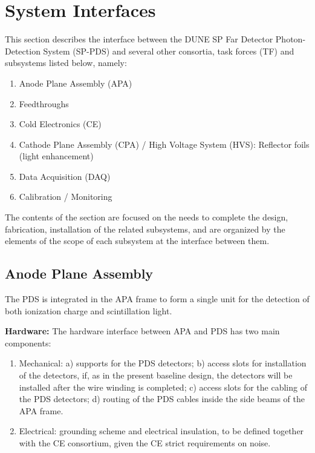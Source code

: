 \section{System Interfaces}
\label{sec:fdsp-pd-intfc}



This section describes the interface between the DUNE SP Far Detector Photon-Detection System (SP-PDS) and several other consortia, task forces (TF) and subsystems listed below, namely:

\begin{enumerate}
\item Anode Plane Assembly (APA)
\item{Feedthroughs}
\item Cold Electronics (CE)
\item{Cathode Plane Assembly (CPA) / High Voltage System (HVS): Reflector foils (light enhancement)}
\item Data Acquisition (DAQ)
\item Calibration / Monitoring
\end{enumerate}

The contents of the section are focused on the needs to complete the design, fabrication, installation of the related subsystems, and are organized by the elements of the scope of each subsystem at the interface between them.
\subsection{Anode Plane Assembly}
\label{sec:fdsp-pd-intfc-apa}
The PDS is integrated in the APA frame to form a single unit for the detection of both ionization charge and scintillation light.

\textbf{Hardware:}
The hardware interface between APA and PDS has two main components:
\begin{enumerate}
\item Mechanical: a) supports for the PDS detectors; b) access slots for installation of the detectors, if, as in the present baseline design, the detectors will be installed after the wire winding is completed; c) access slots for the cabling of the PDS detectors; d) routing of the PDS cables inside the side beams of the APA frame.
\item Electrical: grounding scheme and electrical insulation, to be defined together with the CE consortium, given the CE strict requirements on noise.
\end{enumerate}

